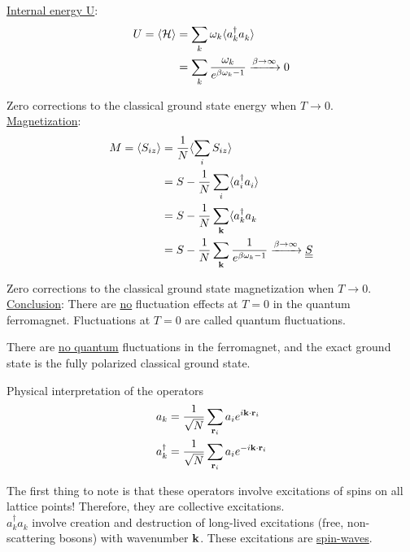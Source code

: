 \uline{Internal energy U}:
\begin{align}
    U = \langle \mathcal{H} \rangle &= \sum_k \omega_k \langle a_k^\dagger a_k^{} \rangle \\
    &= \sum_k \frac{\omega_k}{e^{\beta \omega_k - 1 }} \xrightarrow{\beta \rightarrow \infty} 0 
\end{align}

Zero corrections to the classical ground state energy when $T \rightarrow 0$. \\

\uline{Magnetization}:
\begin{align}
    M = \langle S_{iz} \rangle &= \frac{1}{N} \langle \sum_i S_{iz} \rangle \\
    &= S - \frac{1}{N} \sum_i \langle a_i^\dagger a_i^{} \rangle \\
    &= S - \frac{1}{N} \sum_{\vb{k}} \langle a_k^\dagger a_k^{} \\
    &= S - \frac{1}{N} \sum_{\vb{k}} \frac{1}{e^{\beta \omega_k - 1}} \xrightarrow{\beta \rightarrow \infty} \uline{\uline{ S }}
\end{align}

Zero corrections to the classical ground state magnetization when $T \rightarrow 0$. \\

 \uline{Conclusion}: There are \uline{no} fluctuation effects at $T = 0$ in the quantum ferromagnet. Fluctuations at $T = 0$ are called quantum fluctuations.

\begin{tcolorbox}
    There are \uline{no quantum} fluctuations in the ferromagnet, and the exact ground state is the fully polarized classical ground state.
\end{tcolorbox}

Physical interpretation of the operators
\begin{align}
    a_k &= \frac{1}{\sqrt{N}}\sum_{\vb{r}_i}a_i e^{i \vb{k} \cdot \vb{r}_i} \\
    a_k^\dagger &= \frac{1}{\sqrt{N}}\sum_{\vb{r}_i}a_i e^{-i \vb{k} \cdot \vb{r}_i}
\end{align}

The first thing to note is that these operators involve excitations of spins on all lattice points! Therefore, they are collective excitations. \\
 $a_k^\dagger a_k^{}$ involve creation and destruction of long-lived excitations (free, non-scattering bosons) with wavenumber $\vb{k}$. These excitations are \uline{spin-waves}. \\

